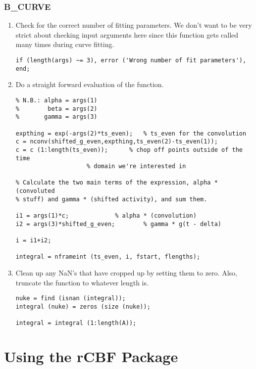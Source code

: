 \subsubsection{B\_CURVE}
\begin{enumerate}

\item Check for the correct number of fitting parameters.  We don't
want to be very strict about checking input arguments here since this
function gets called many times during curve fitting.
\begin{verbatim}
if (length(args) ~= 3), error ('Wrong number of fit parameters'), end;
\end{verbatim}

\item Do a straight forward evaluation of the function.  
\begin{verbatim}
% N.B.: alpha = args(1)
%        beta = args(2)
%       gamma = args(3)

expthing = exp(-args(2)*ts_even); 	% ts_even for the convolution
c = nconv(shifted_g_even,expthing,ts_even(2)-ts_even(1));
c = c (1:length(ts_even));		% chop off points outside of the time
					% domain we're interested in

% Calculate the two main terms of the expression, alpha * (convoluted
% stuff) and gamma * (shifted activity), and sum them.

i1 = args(1)*c;				% alpha * (convolution)
i2 = args(3)*shifted_g_even;		% gamma * g(t - delta)

i = i1+i2;

integral = nframeint (ts_even, i, fstart, flengths);
\end{verbatim}

\item Clean up any NaN's that have cropped up by setting them to zero.
Also, truncate the function to whatever length  is.
\begin{verbatim}
nuke = find (isnan (integral));
integral (nuke) = zeros (size (nuke));

integral = integral (1:length(A));
\end{verbatim}
\end{enumerate}


\newpage
\section{Using the rCBF Package}

